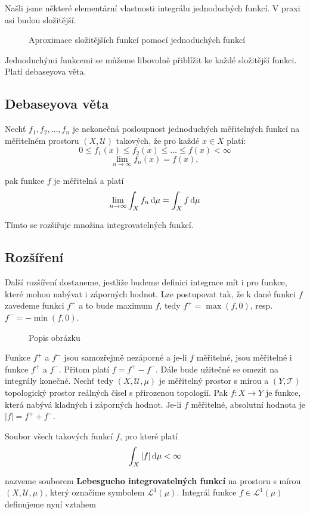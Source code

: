 Našli jsme některé elementární vlastnosti integrálu jednoduchých funkcí. V praxi asi budou složitější.

\begin{figure}

\caption{Aproximace složitějších funkcí pomocí jednoduchých funkcí}
\end{figure}

Jednoduchými funkcemi se můžeme libovolně přiblížit ke každé složitější funkci. Platí debaseyova věta.

\subsection{Debaseyova věta}
Nechť $f_1,f_2,\ldots,f_n$ je nekonečná posloupnost jednoduchých měřitelných funkcí na měřitelném prostoru $(X,\mathscr{U})$ takových, že pro každé $x\in X$ platí:
\[ 0\leq f_1(x) \leq f_2(x)\leq \ldots \leq f(x)<\infty\]
\[ \lim_{n\to\infty} f_n(x) = f(x), \]

pak funkce $f$ je měřitelná a platí 
\[ \lim_{n\to\infty} \int_X f_n\,\mathrm{d} \mu = \int_X f\,\mathrm{d} \mu
\]

Tímto se rozšiřuje množina integrovatelných funkcí.

\subsection{Rozšíření}
Další rozšíření dostaneme, jestliže budeme definici integrace mít i pro funkce, které mohou nabývat i záporných hodnot. Lze postupovat tak, že k dané funkci $f$ zavedeme funkci $f^+$ a to bude maximum $f$, tedy $f^+=\max(f,0)$, resp. $f^-=-\min(f,0)$.

\begin{figure}

\caption{Popis obrázku}
\end{figure}


Funkce $f^+$ a $f^-$ jsou samozřejmě nezáporné a je-li $f$ měřitelné, jsou měřitelné i funkce $f^+$ a $f^-$. Přitom platí $f=f^+-f^-$. Dále bude užitečné se omezit na integrály konečné. Nechť tedy $(X,\mathscr{U},\mu)$ je měřitelný prostor s mírou a $(Y,\mathscr{T})$ topologický prostor reálných čísel s přirozenou topologií. Pak $f:X\to Y$ je funkce, která nabývá kladných i záporných hodnot. Je-li $f$ měřitelné, absolutní hodnota je $|f|=f^+ + f^-$.\br

Soubor všech takových funkcí $f$, pro které platí
\[ \int_X |f|\,\mathrm{d} \mu<\infty \]

nazveme souborem \textbf{Lebesgueho integrovatelných funkcí} na prostoru s mírou $(X,\mathscr{U},\mu)$, který označíme symbolem $\mathscr{L}^1(\mu)$. Integrál funkce $f\in\mathscr{L}^1(\mu)$ definujeme nyní vztahem

